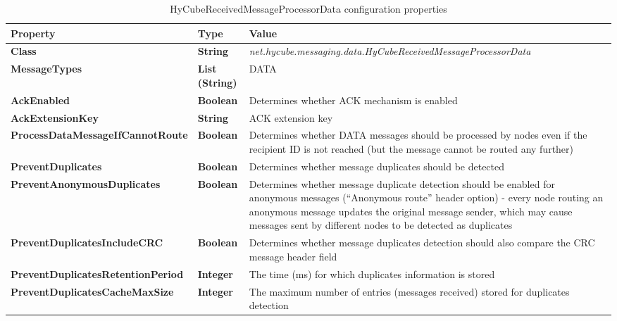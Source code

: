 \begin{table}
\scriptsize
\begin{center}
\begin{tabular}{p{4.5cm} p{1.5cm} p{8.5cm}}
	\hline
	\textbf{Property}								& \textbf{Type}					& \textbf{Value}					\\[1mm]
    \hline
	\textbf{Class}									& \textbf{String}				& \textit{net.hycube.messaging.data.HyCubeReceivedMessageProcessorData}									\\[1.5mm]	
	\textbf{MessageTypes}							& \textbf{List (String)}		& DATA																									\\[1.5mm]	
	\textbf{AckEnabled}								& \textbf{Boolean}				& Determines whether ACK mechanism is enabled															\\[1.5mm]	
	\textbf{AckExtensionKey}						& \textbf{String}				& ACK extension key																						\\[1.5mm]	
	\textbf{ProcessDataMessageIfCannotRoute}		& \textbf{Boolean}				& Determines whether DATA messages should be processed by nodes even if the recipient ID is not reached (but the message cannot be routed any further)		\\[1.5mm]	
	\textbf{PreventDuplicates}						& \textbf{Boolean}				& Determines whether message duplicates should be detected						\\[1.5mm]
	\textbf{PreventAnonymousDuplicates}				& \textbf{Boolean}				& Determines whether message duplicate detection should be enabled for anonymous messages (``Anonymous route'' header option) - every node routing an anonymous message updates the original message sender, which may cause messages sent by different nodes to be detected as duplicates 				\\[1.5mm]
	\textbf{PreventDuplicatesIncludeCRC}			& \textbf{Boolean}				& Determines whether message duplicates detection should also compare the CRC message header field				\\[1.5mm]	
	\textbf{PreventDuplicatesRetentionPeriod}		& \textbf{Integer}				& The time (ms) for which duplicates information is stored						\\[1.5mm]	
	\textbf{PreventDuplicatesCacheMaxSize}			& \textbf{Integer}				& The maximum number of entries (messages received) stored for duplicates detection					\\[1.5mm]	
    \hline
\end{tabular}
\end{center}
\caption{HyCubeReceivedMessageProcessorData configuration properties}
\label{tab:libHyCubeReceivedMessageProcessorData}
\end{table}

